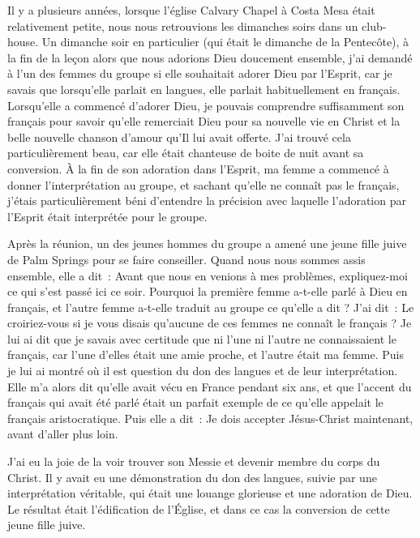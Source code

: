 Il y a plusieurs années, lorsque l'église Calvary Chapel à Costa Mesa était
 relativement petite, nous nous retrouvions les dimanches soirs dans un
 club-house. Un dimanche soir en particulier (qui était le dimanche
 de la Pentecôte), à la fin de la leçon alors que nous adorions Dieu
 doucement ensemble, j'ai demandé à l'un des femmes du groupe si elle
 souhaitait adorer Dieu par l'Esprit, car je savais que lorsqu'elle parlait
 en langues, elle parlait habituellement en français.
 Lorsqu'elle a commencé d'adorer Dieu, je pouvais comprendre suffisamment
 son français pour savoir qu'elle remerciait Dieu pour sa nouvelle vie
 en Christ et la belle nouvelle chanson d'amour qu'Il lui avait offerte.
 J'ai trouvé cela particulièrement beau, car elle était chanteuse de boite
 de nuit avant sa conversion. À la fin de son adoration dans l'Esprit,
 ma femme a commencé à donner l'interprétation au groupe, et sachant
 qu'elle ne connaît pas le français, j'étais particulièrement béni
 d'entendre la précision avec laquelle l'adoration par l'Esprit
 était interprétée pour le groupe.

Après la réunion, un des jeunes hommes du groupe a amené une jeune fille
 juive de Palm Springs pour se faire conseiller. Quand nous nous sommes
 assis ensemble, elle a dit~: \og Avant que nous en venions à mes problèmes,
 expliquez-moi ce qui s'est passé ici ce soir. Pourquoi la première
 femme a-t-elle parlé à Dieu en français, et l'autre femme a-t-elle
 traduit au groupe ce qu'elle a dit ? \fg{}
 J'ai dit~: \og Le croiriez-vous si je vous disais qu'aucune de ces femmes
 ne connaît le français ? \fg{} Je lui ai dit que je savais avec certitude
 que ni l'une ni l'autre ne connaissaient le français, car l'une d'elles
 était une amie proche, et l'autre était ma femme. Puis je lui ai montré
  où il est question du don des langues
 et de leur in\-ter\-pré\-ta\-tion. Elle m'a alors dit qu'elle avait vécu en France
 pendant six ans, et que l'accent du français qui avait été parlé était
 un parfait exemple de ce qu'elle appelait le français aristocratique.
 Puis elle a dit~: \og Je dois accepter Jésus-Christ maintenant,
 avant d'aller plus loin. \fg{}

J'ai eu la joie de la voir trouver son Messie et devenir membre du corps
 du Christ. Il y avait eu une démonstration du don des langues,
 suivie par une interprétation véritable, qui était une louange glorieuse
 et une adoration de Dieu. Le résultat était l'édification de l'Église,
 et dans ce cas la conversion de cette jeune fille juive.
\closechapter

